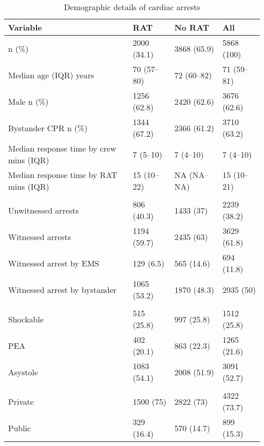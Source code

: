 \documentclass[]{article}
\theoremstyle{definition}
\theoremstyle{definition}
\theoremstyle{definition}
\theoremstyle{remark}
\begin{document}
\begin{table}

\caption{\label{tab:demotable}Demographic details of cardiac arrests}
\centering
\begin{tabular}[t]{llll}
\toprule
Variable & RAT & No RAT & All\\
\midrule
n (\%) & 2000 (34.1) & 3868 (65.9) & 5868 (100)\\
Median age (IQR) years & 70 (57--80) & 72 (60--82) & 71 (59--81)\\
Male n (\%) & 1256 (62.8) & 2420 (62.6) & 3676 (62.6)\\
Bystander CPR n (\%) & 1344 (67.2) & 2366 (61.2) & 3710 (63.2)\\
Median response time by crew mins (IQR) & 7 (5--10) & 7 (4--10) & 7 (4--10)\\
Median response time by RAT mins (IQR) & 15 (10--22) & NA (NA--NA) & 15 (10--21)\\
\addlinespace[0.3em]
\multicolumn{4}{l}{\textbf{Witness status n (\%)}}\\
\hspace{1em}Unwitnessed arrests & 806 (40.3) & 1433 (37) & 2239 (38.2)\\
\hspace{1em}Witnessed arrests & 1194 (59.7) & 2435 (63) & 3629 (61.8)\\
\hspace{1em}Witnessed arrest by EMS & 129 (6.5) & 565 (14.6) & 694 (11.8)\\
\hspace{1em}Witnessed arrest by bystander & 1065 (53.2) & 1870 (48.3) & 2935 (50)\\
\addlinespace[0.3em]
\multicolumn{4}{l}{\textbf{Presenting rhythm n (\%)}}\\
\hspace{1em}Shockable & 515 (25.8) & 997 (25.8) & 1512 (25.8)\\
\hspace{1em}PEA & 402 (20.1) & 863 (22.3) & 1265 (21.6)\\
\hspace{1em}Asystole & 1083 (54.1) & 2008 (51.9) & 3091 (52.7)\\
\addlinespace[0.3em]
\multicolumn{4}{l}{\textbf{Location n (\%)}}\\
\hspace{1em}Private & 1500 (75) & 2822 (73) & 4322 (73.7)\\
\hspace{1em}Public & 329 (16.4) & 570 (14.7) & 899 (15.3)\\

\end{tabular}
\end{table}
\end{document}
